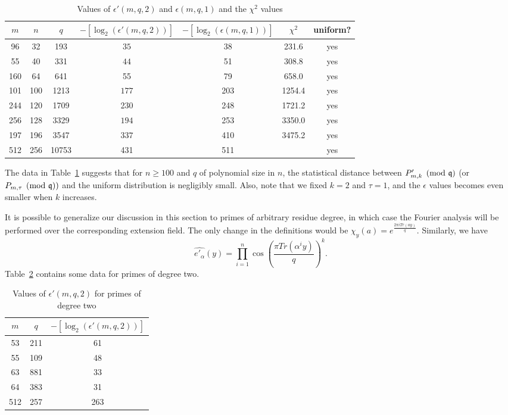 \documentclass[envcountsect]{llncs}
\begin{document}
\begin{table}[H]
\caption{Values of $\epsilon'(m,q,2)$ and $\epsilon(m,q,1)$ and the $\chi^2$ values}
\label{tab: deg1}
\begin{center}
\begin{tabular}{c|c|c|c|c|c|c}
$m$ & $n$ & $q$ & $-[\log_2(\epsilon'(m,q, 2))]$ & $-[\log_2(\epsilon(m,q, 1))]$ & $\chi^2$ & uniform? \\
\hline
96 & 32 & 193 & $35$ & 38 & 231.6 & yes \\
55 & 40 & 331  & $44$ & 51 & 308.8 & yes \\
160 & 64 & 641 & 55 & 79& 658.0 & yes \\
101 & 100 & 1213 & $177$ & 203 & 1254.4 & yes \\
244 & 120 & 1709 & 230 & 248 & 1721.2 & yes \\
256 & 128 & 3329 & $194$ & 253 & 3350.0 & yes \\
197 & 196 & 3547 & $337$ & 410 & 3475.2 & yes \\
512 & 256 &10753 & 431 & 511 &  & yes\\
\end{tabular}
\end{center}
\end{table}

The data in Table~\ref{tab: deg1} suggests that for $n \geq 100$ and $q$ of polynomial size in $n$, the statistical distance between $P'_{m,k} \pmod{\mathfrak{q}}$ (or $P_{m,\tau} \pmod{\mathfrak{q}})$ and the uniform distribution is negligibly small. Also, note that we fixed $k= 2$ and $\tau = 1$, and the $\epsilon$ values becomes even smaller when $k$ increases.


It is possible to generalize our discussion in this section to primes of arbitrary residue degree, in which case the Fourier analysis will be performed over the corresponding extension field. The only change in the definitions would be $\chi_y(a) = e^{ \frac{2 \pi i Tr(a y)}{q}}$. Similarly, we have
\[
    \widehat{e'_\alpha}(y) = \prod_{i=1}^{n} \cos \left(\frac{ \pi Tr(\alpha^i y) }{q} \right)^k.
\]
Table~\ref{tab: deg2} contains some data for primes of degree two.

\begin{table}[H] 
\caption{Values of $\epsilon'(m,q,2)$ for primes of degree two}
\begin{center}
\begin{tabular}{c|c|c} \label{tab: deg2}
$m$ & $q$ & $-[\log_2(\epsilon'(m,q,2))]$ \\
\hline
53 & 211 & 61 \\
55 & 109 & 48 \\
63 & 881 & 33 \\
64 & 383 & 31 \\
512 & 257 & 263
\end{tabular}
\end{center}
\end{table}
\end{document}
